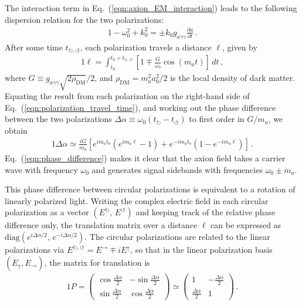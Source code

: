 \documentclass[aps,prd,nofootinbib,twocolumn,superscriptaddress,preprintnumbers,letterpaper, longbibliography]{revtex4-1}
\begin{document}
The interaction term in Eq.~(\ref{eqn:axion_EM_interaction}) leads to the following dispersion relation for the two polarizations:
%
\begin{alignat}{1}
    - \omega_0^2 + k_0^2 = \pm k_0 g_{a\gamma\gamma} \frac{\partial a}{\partial t} \,.
\end{alignat}
%
After some time $t_{\circlearrowright, \circlearrowleft}$, each polarization travels a distance $\ell$, given by
%
\begin{alignat}{1}
    \ell = \int_{t_0}^{t_0 + t_{\circlearrowright, \circlearrowleft}} \left[ 1 \mp \frac{G}{\omega_0} \cos(m_a t) \right] \, dt \,,
    \label{eqn:polarization_travel_time}
\end{alignat}
%
where $G \equiv g_{a\gamma\gamma} \sqrt{2 \rho_\text{DM}}/2$, and $\rho_\text{DM} = m_a^2 a_0^2/2$ is the local density of dark matter. Equating the result from each polarization on the right-hand side of Eq.~(\ref{eqn:polarization_travel_time}), and working out the phase difference between the two polarizations $\Delta \alpha \equiv \omega_0 (t_{\circlearrowright} - t_{\circlearrowleft})$ to first order in $G/m_a$, we obtain  
%
\begin{alignat}{1}
    \Delta \alpha \simeq \frac{iG}{m_a} \left[ e^{i m_a t_0} \left(e^{i m_a \ell} - 1\right) + e^{-i m_a t_0} \left(1 - e^{-i m_a \ell} \right)\right]\, .
    \label{eqn:phase_difference}
\end{alignat}
%
Eq.~(\ref{eqn:phase_difference}) makes it clear that the axion field takes a carrier wave with frequency $\omega_0$ and generates signal sidebands with frequencies $\omega_0 \pm m_a$. 

This phase difference between circular polarizations is equivalent to a rotation of linearly polarized light. Writing the complex electric field in each circular polarization as a vector $(E^\circlearrowright,\, E^\circlearrowleft)$ and keeping track of the relative phase difference only, the translation matrix over a distance $\ell$ can be expressed as $\text{diag}(e^{i \Delta \alpha/2},\, e^{-i \Delta \alpha/2})$. The circular polarizations are related to the linear polarizations via $E^{\circlearrowright,\circlearrowleft} = E^\rightarrow \mp i E^\uparrow$, so that in the linear polarization basis $(E_\uparrow, E_\rightarrow)$, the matrix for translation is 
%
\begin{alignat}{1}
    P = \begin{pmatrix}
        \cos \frac{\Delta \alpha}{2} & - \sin \frac{\Delta \alpha}{2} \\
        \sin \frac{\Delta \alpha}{2} & \cos \frac{\Delta \alpha}{2} 
    \end{pmatrix} \simeq \begin{pmatrix}
        1 & - \frac{\Delta \alpha}{2} \\
        \frac{\Delta \alpha}{2} & 1 
    \end{pmatrix} \,.
    \label{eqn:2x2_translation_matrix}
\end{alignat}
%
\vspace{0.2cm}
\end{document}

